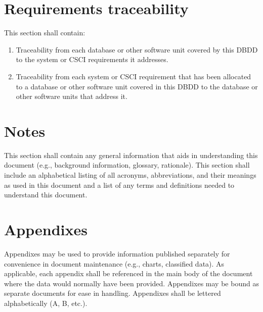\documentclass{fidata-report-template}
\begin{document}
\section{Requirements traceability}

This section shall contain:

\begin{enumerate}
\itemsep1pt\parskip0pt
\item
  Traceability from each database or other software unit covered by this
  DBDD to the system or CSCI requirements it addresses.
\item
  Traceability from each system or CSCI requirement that has been
  allocated to a database or other software unit covered in this DBDD to
  the database or other software units that address it.
\end{enumerate}

\section{Notes}

This section shall contain any general information that aids in
understanding this document (e.g., background information, glossary,
rationale). This section shall include an alphabetical listing of all
acronyms, abbreviations, and their meanings as used in this document and
a list of any terms and definitions needed to understand this document.

\appendix

\section{Appendixes}

Appendixes may be used to provide information published separately for
convenience in document maintenance (e.g., charts, classified data). As
applicable, each appendix shall be referenced in the main body of the
document where the data would normally have been provided. Appendixes
may be bound as separate documents for ease in handling. Appendixes
shall be lettered alphabetically (A, B, etc.).
\end{document}
